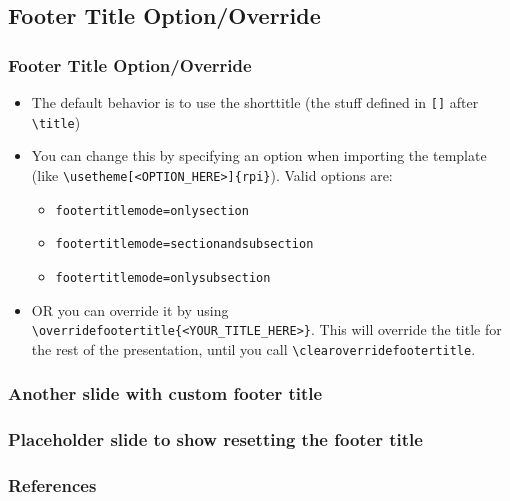 \documentclass[
	10pt, %
	aspectratio=169, %
]{beamer}
\begin{document}
\subsection{Footer Title Option/Override}
\begin{frame}
	\frametitle{Footer Title Option/Override}
	\begin{itemize}
		\item The default behavior is to use the shorttitle (the stuff defined in \texttt{[]} after \texttt{\textbackslash title})
		\item You can change this by specifying an option when importing the template (like \texttt{\textbackslash usetheme[<OPTION\_HERE>]\{rpi\}}). Valid options are:
		      \begin{itemize}
			      \item \texttt{footertitlemode=onlysection}
			      \item \texttt{footertitlemode=sectionandsubsection}
			      \item \texttt{footertitlemode=onlysubsection}
		      \end{itemize}
		\item OR you can override it by using \texttt{\textbackslash overridefootertitle\{<YOUR\_TITLE\_HERE>\}}. This will override the title for the rest of the presentation, until you call \texttt{\textbackslash clearoverridefootertitle}.
	\end{itemize}
\end{frame}

\begin{frame}
	\frametitle{Another slide with custom footer title}
\end{frame}

\begin{frame}
	\clearfootertitleoverride
	\frametitle{Placeholder slide to show resetting the footer title}
\end{frame}

\begin{frame}[allowframebreaks]
	\frametitle{References}
	\printbibliography
\end{frame}
\end{document}

